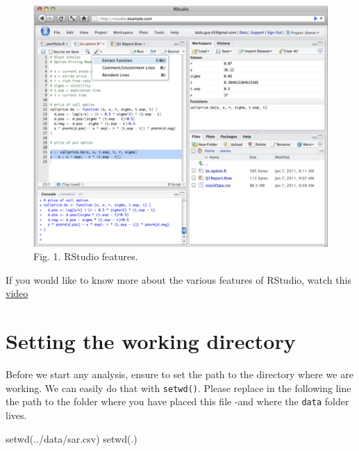 \documentclass[
  letterpaper,
  DIV=11,
  numbers=noendperiod,
  oneside]{scrreprt}
\newenvironment{Shaded}{\begin{snugshade}}{\end{snugshade}}
\newcommand{\FunctionTok}[1]{\textcolor[rgb]{0.28,0.35,0.67}{#1}}
\newcommand{\NormalTok}[1]{\textcolor[rgb]{0.00,0.23,0.31}{#1}}
\newcommand{\StringTok}[1]{\textcolor[rgb]{0.13,0.47,0.30}{#1}}
\begin{document}
\begin{figure}[H]

{\centering \includegraphics{figs/ch2/rstudio_features.png}

}

\caption{Fig. 1. RStudio features.}

\end{figure}%

If you would like to know more about the various features of RStudio,
watch this \href{https://rstudio.com/products/rstudio/}{video}

\section{Setting the working
directory}\label{setting-the-working-directory}

Before we start any analysis, ensure to set the path to the directory
where we are working. We can easily do that with \texttt{setwd()}.
Please replace in the following line the path to the folder where you
have placed this file -and where the \texttt{data} folder lives.

\begin{Shaded}
\begin{Highlighting}[]
\FunctionTok{setwd}\NormalTok{(}\StringTok{\textquotesingle{}../data/sar.csv\textquotesingle{}}\NormalTok{)}
\FunctionTok{setwd}\NormalTok{(}\StringTok{\textquotesingle{}.\textquotesingle{}}\NormalTok{)}
\end{Highlighting}
\end{Shaded}
\end{document}
